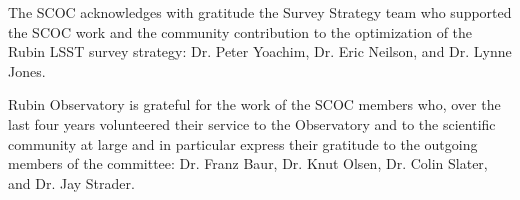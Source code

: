 The SCOC acknowledges with gratitude the Survey Strategy team who supported the SCOC work and the community contribution to the optimization of the Rubin LSST survey strategy: Dr. Peter Yoachim, Dr. Eric Neilson, and Dr. Lynne Jones. 

Rubin Observatory is grateful for the work of the SCOC members who, over the last four years volunteered their service to the Observatory and to the scientific community at large and in particular express their gratitude to the outgoing members of the committee: Dr. Franz Baur, Dr. Knut Olsen, Dr. Colin Slater, and Dr. Jay Strader.


 